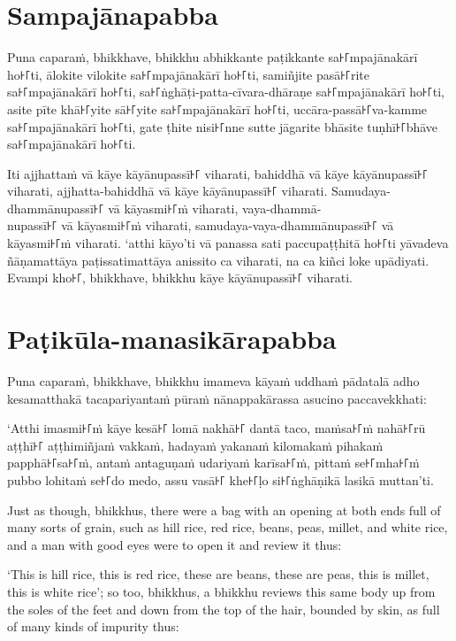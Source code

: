 \paliPage
\section*{Sampajānapabba}

Puna caparaṁ, bhikkhave, bhikkhu abhikkante paṭikkante sa꜔꜒mpajānakārī ho꜔꜒ti,
ālokite vilokite sa꜔꜒mpajānakārī ho꜔꜒ti, samiñjite pasā꜔꜒rite sa꜔꜒mpajānakārī ho꜔꜒ti,
sa꜔꜒ṅghāṭi-patta-cīvara-dhāraṇe sa꜔꜒mpajānakārī ho꜔꜒ti, asite pīte khā꜔꜒yite sā꜔꜒yite
sa꜔꜒mpajānakārī ho꜔꜒ti, uccāra-passā꜔꜒va-kamme sa꜔꜒mpajānakārī ho꜔꜒ti, gate ṭhite nisi꜔꜒nne
sutte jāgarite bhāsite tuṇhī꜔꜒bhāve sa꜔꜒mpajānakārī ho꜔꜒ti.

Iti ajjhattaṁ vā kāye kāyānupassī꜔꜒ viharati, bahiddhā vā kāye kāyānupassī꜔꜒
viharati, ajjhatta-bahiddhā vā kāye kāyānupassī꜔꜒ viharati. Samudaya-dhammānupassī꜔꜒
vā kāyasmi꜔꜒ṁ viharati, vaya-dhammā-\\
nupassī꜔꜒ vā kāyasmi꜔꜒ṁ viharati, samudaya-vaya-dhammānupassī꜔꜒ vā kāyasmi꜔꜒ṁ viharati.
‘atthi kāyo’ti vā panassa sati paccupaṭṭhitā ho꜔꜒ti yāvadeva ñāṇamattāya
paṭissatimattāya anissito ca viharati, na ca kiñci loke upādiyati. Evampi kho꜔꜒,
bhikkhave, bhikkhu kāye kāyānupassī꜔꜒ viharati.


\section*{Paṭikūla-manasikārapabba}

Puna caparaṁ, bhikkhave, bhikkhu imameva kāyaṁ uddhaṁ pādatalā adho kesamatthakā
tacapariyantaṁ pūraṁ nānappakārassa asucino paccavekkhati:

‘Atthi imasmi꜔꜒ṁ kāye kesā꜔꜒ lomā nakhā꜔꜒ dantā taco, maṁsa꜔꜒ṁ nahā꜔꜒rū aṭṭhī꜔꜒ aṭṭhimiñjaṁ
vakkaṁ, hadayaṁ yakanaṁ kilomakaṁ pihakaṁ papphā꜔꜒sa꜔꜒ṁ, antaṁ antaguṇaṁ udariyaṁ
karīsa꜔꜒ṁ, pittaṁ se꜔꜒mha꜔꜒ṁ pubbo lohitaṁ se꜔꜒do medo, assu vasā꜔꜒ khe꜔꜒ḷo si꜔꜒ṅghāṇikā
lasikā muttan’ti.

\englishPage

Just as though, bhikkhus, there were a bag with an opening at both ends full of
many sorts of grain, such as hill rice, red rice, beans, peas, millet, and white
rice, and a man with good eyes were to open it and review it thus:

‘This is hill rice, this is red rice, these are beans, these are peas, this is
millet, this is white rice’; so too, bhikkhus, a bhikkhu reviews this same body
up from the soles of the feet and down from the top of the hair, bounded by
skin, as full of many kinds of impurity thus:

